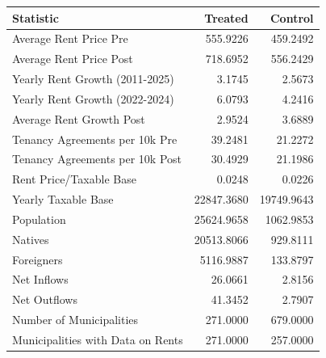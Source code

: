 \begin{tabular}{lrr}
\toprule
Statistic & Treated & Control \\
\midrule
Average Rent Price Pre & 555.9226 & 459.2492 \\
Average Rent Price Post & 718.6952 & 556.2429 \\
Yearly Rent Growth (2011-2025) & 3.1745 & 2.5673 \\
Yearly Rent Growth (2022-2024) & 6.0793 & 4.2416 \\
Average Rent Growth Post & 2.9524 & 3.6889 \\
Tenancy Agreements per 10k Pre & 39.2481 & 21.2272 \\
Tenancy Agreements per 10k Post & 30.4929 & 21.1986 \\
Rent Price/Taxable Base & 0.0248 & 0.0226 \\
Yearly Taxable Base & 22847.3680 & 19749.9643 \\
Population & 25624.9658 & 1062.9853 \\
Natives & 20513.8066 & 929.8111 \\
Foreigners & 5116.9887 & 133.8797 \\
Net Inflows & 26.0661 & 2.8156 \\
Net Outflows & 41.3452 & 2.7907 \\
Number of Municipalities & 271.0000 & 679.0000 \\
Municipalities with Data on Rents & 271.0000 & 257.0000 \\
\bottomrule
\end{tabular}

